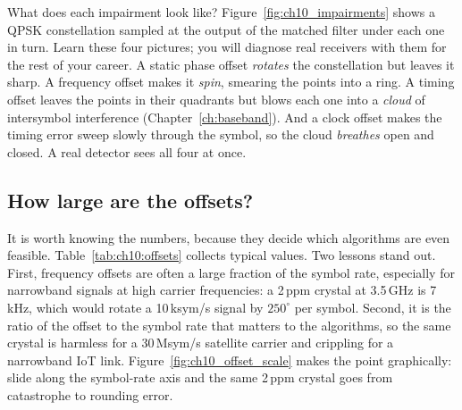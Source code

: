 What does each impairment look like? Figure~\ref{fig:ch10_impairments} shows a QPSK constellation
sampled at the output of the matched filter under each one in turn. Learn these four pictures;
you will diagnose real receivers with them for the rest of your career. A static phase offset
\emph{rotates} the constellation but leaves it sharp. A frequency offset makes it \emph{spin},
smearing the points into a ring. A timing offset leaves the points in their quadrants but blows
each one into a \emph{cloud} of intersymbol interference (Chapter~\ref{ch:baseband}). And a clock
offset makes the timing error sweep slowly through the symbol, so the cloud \emph{breathes} open
and closed. A real detector sees all four at once.

\subsection{How large are the offsets?}

It is worth knowing the numbers, because they decide which algorithms are even feasible.
Table~\ref{tab:ch10:offsets} collects typical values. Two lessons stand out. First, frequency
offsets are often a large fraction of the symbol rate, especially for narrowband signals at high
carrier frequencies: a 2\,ppm crystal at 3.5\,GHz is 7\,kHz, which would rotate a 10\,ksym/s
signal by $250^\circ$ per symbol. Second, it is the ratio of the offset to the symbol rate that
matters to the algorithms, so the same crystal is harmless for a 30\,Msym/s satellite carrier and
crippling for a narrowband IoT link. Figure~\ref{fig:ch10_offset_scale} makes the point
graphically: slide along the symbol-rate axis and the same 2\,ppm crystal goes from catastrophe
to rounding error.


